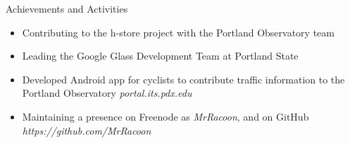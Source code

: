 \documentclass[11pt,oneside]{article}
\newenvironment{ressection}[1]{
    \vspace{4pt}
    {\fontfamily{phv}\selectfont\Large#1}
    \begin{itemize}
    \vspace{3pt}
}{
    \end{itemize}
}
\newcommand{\resitem}[1]{
    \vspace{-4pt}
    \item \begin{flushleft} #1 \end{flushleft}
}
\begin{document}
\begin{ressection}{Achievements and Activities}
    \resitem{Contributing to the h-store project with the Portland Observatory team}
    \resitem{Leading the Google Glass Development Team at Portland State}
    \resitem{Developed Android app for cyclists to contribute traffic information to the Portland Observatory \textit{portal.its.pdx.edu}}
    \resitem{Maintaining a presence on Freenode as \textit{MrRacoon}, and on GitHub \textit{https://github.com/MrRacoon}}
\end{ressection}
\end{document}
